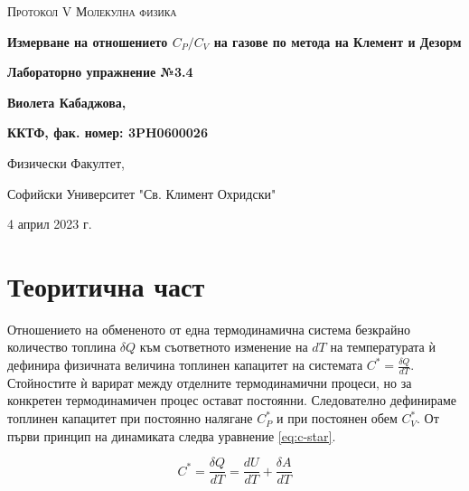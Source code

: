 \documentclass[12pt]{article}
\begin{document}
\begin{titlepage}
	\flushleft
	{\scshape\Large Протокол V \hspace{2cm} Молекулна физика\par}
	\vspace{4cm}
	{\huge\bfseries Измерване на отношението $C_P/C_V$ на газове по метода на Клемент и Дезорм\par}
	\vspace{1cm}
	{\LARGE\bfseries Лабораторно упражнение №3.4\par}
	\vspace{5cm}
    {\LARGE\bfseries Виолета Кабаджова, \par}
    {\large\bfseries ККТФ, фак. номер: 3PH0600026\par}
	\vspace{1cm}
	
	{\large Физически Факултет, 
	
	Софийски Университет "Св. Климент Охридски"
	
	4 април 2023 г.\par}
	
\end{titlepage}


\section{Теоритична част}\label{sec:theoretical-part}
Отношението на обмененото от една термодинамична система безкрайно количество топлина $\delta Q$ към съответното изменение на $dT$ на температурата ѝ дефинира физичната величина топлинен капацитет на системата $C^* = \frac{\delta Q}{dT}$. Стойностите ѝ варират между отделните термодинамични процеси, но за конкретен термодинамичен процес остават постоянни. Следователно дефинираме топлинен капацитет при постоянно налягане $C^*_P$ и при постоянен обем $C^*_V$. От първи принцип на динамиката следва уравнение \ref{eq:c-star}.

\begin{equation}\label{eq:c-star}
    C^* = \frac{\delta Q}{dT} = \frac{dU}{dT} + \frac{\delta A}{dT}
\end{equation}
\end{document}
